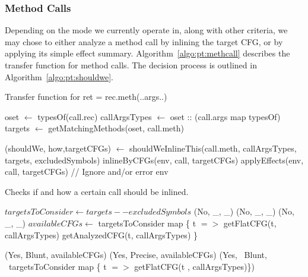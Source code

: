 \documentclass[a4paper]{article}
\begin{document}
\subsubsection{Method Calls}
Depending on the mode we currently operate in, along with other criteria, we
may chose to either analyze a method call by inlining the target CFG, or by
applying its simple effect summary. Algorithm~\ref{algo:pt:methcall} describes
the transfer function for method calls. The decision process is outlined in
Algorithm~\ref{algo:pt:shouldwe}.

\begin{algorithm}
\caption{Transfer function for ret = rec.meth(..args..)}\label{algo:pt:methcall}
\begin{algorithmic}[1]
    \State oset $\gets$ typesOf(call.rec)
    \State callArgsTypes $\gets$ oset :: (call.args map typesOf)
    \State targets $\gets$ getMatchingMethods(oset, call.meth)

    \State (shouldWe, how,targetCFGs) $\gets$ shouldWeInlineThis(call.meth, callArgsTypes, targets, excludedSymbols)
            \State \Return inlineByCFGs(env, call, targetCFGs)
        \Else
            \State \Return applyEffects(env, call, targetCFGs)
        \EndIf
    \Else
        \State // Ignore and/or error
        \State \Return env
    \EndIf
\EndFunction
\end{algorithmic}
\end{algorithm}

\begin{algorithm}
\caption{Checks if and how a certain call should be inlined.}\label{algo:pt:shouldwe}
\begin{algorithmic}[1]
    \State $targetsToConsider \gets targets -- excludedSymbols$
            \State \Return (No, \_, \_)
            \State \Return (No, \_, \_)
            \State \Return (No, \_, \_)
        \Else
            \State $availableCFGs \gets$ targetsToConsider map \{ t $=>$
                \State getFlatCFG(t, callArgsTypes)
            \Else
                \State getAnalyzedCFG(t, callArgsTypes)
            \EndIf
            \State \}

                \State \Return (Yes, Blunt, availableCFGs)
            \Else
                \State \Return (Yes, Precise, availableCFGs)
            \EndIf
        \EndIf
    \Else
        \State \Return (Yes, ~Blunt, ~targetsToConsider map \{ t $=>$ getFlatCFG(t , callArgsTypes)\})
    \EndIf
\EndFunction
\end{algorithmic}
\end{algorithm}
\end{document}
